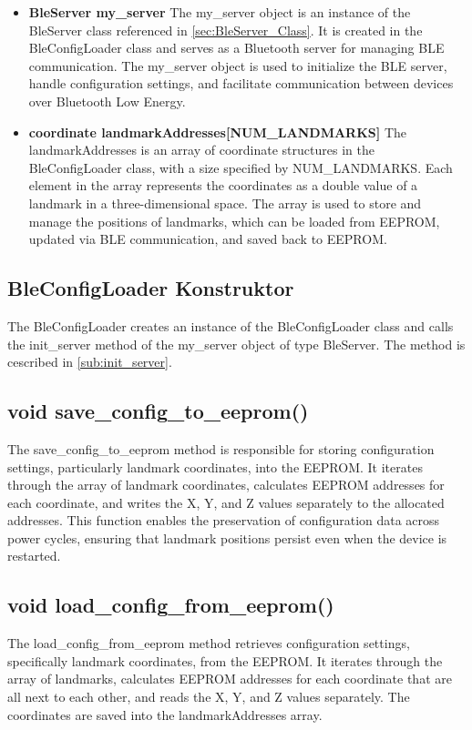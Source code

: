 \begin{itemize}
	\item \textbf{BleServer my\_server}
	\newline
	The my\_server object is an instance of the BleServer class referenced in \ref{sec:BleServer_Class}. 
	It is created in the BleConfigLoader class and serves as a Bluetooth server for managing BLE communication. 
	The my\_server object is used to initialize the BLE server, handle configuration settings, and facilitate communication between devices over Bluetooth Low Energy.
	
	\item \textbf{coordinate landmarkAddresses[NUM\_LANDMARKS]}
	\newline
	The landmarkAddresses is an array of coordinate structures in the BleConfigLoader class, with a size specified by NUM\_LANDMARKS. 
	Each element in the array represents the coordinates as a double value of a landmark in a three-dimensional space. 
	The array is used to store and manage the positions of landmarks, which can be loaded from EEPROM, updated via BLE communication, and saved back to EEPROM. 
	
\end{itemize}

\subsection{BleConfigLoader Konstruktor}
\label{sub:BleConfigLoader_Konstruktor}
The BleConfigLoader creates an instance of the BleConfigLoader class and calls the init\_server method of the my\_server object of type BleServer. 
The method is cescribed in \ref{sub:init_server}. 

\subsection{void save\_config\_to\_eeprom()}
\label{sub:save_config_to_eeprom}
The save\_config\_to\_eeprom method is responsible for storing configuration settings, particularly landmark coordinates, into the EEPROM. 
It iterates through the array of landmark coordinates, calculates EEPROM addresses for each coordinate, and writes the X, Y, and Z values separately to the allocated addresses. 
This function enables the preservation of configuration data across power cycles, ensuring that landmark positions persist even when the device is restarted.

\subsection{void load\_config\_from\_eeprom()}
\label{sub:load_config_from_eeprom}
The load\_config\_from\_eeprom method retrieves configuration settings, specifically landmark coordinates, from the EEPROM. 
It iterates through the array of landmarks, calculates EEPROM addresses for each coordinate that are all next to each other, and reads the X, Y, and Z values separately. 
The coordinates are saved into the landmarkAddresses array. 

